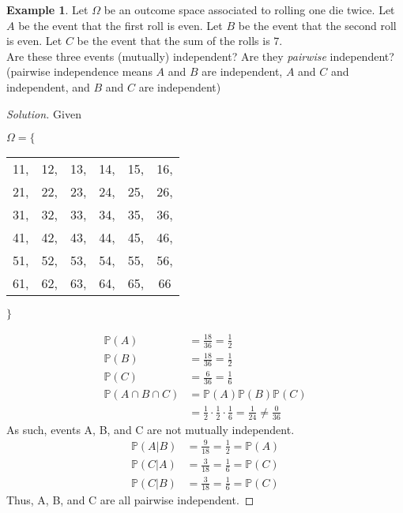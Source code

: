 \documentclass[12pt]{article}
\newcommand{\bbP}{\mathbb{P}}
\renewcommand{\_}[1]{\underline{ #1 }}
\theoremstyle{definition}
\newtheorem{example}[theorem]{Example}
\numberwithin{equation}{subsection}
\begin{document}
	\begin{example}
	Let $\Omega$ be an outcome space associated to rolling one die twice. Let $A$ be the event that the first roll is even. Let $B$ be the event that the second roll is even. Let $C$ be the event that the sum of the rolls is $7$.\\
	Are these three events (mutually) independent? Are they \textit{pairwise} independent? (pairwise independence means $A$ and $B$ are independent, $A$ and $C$ and independent, and $B$ and $C$ are independent)
		\begin{proof}[Solution]
    Given
    \begin{center}
      $\Omega=\Bigg\{$
      \begin{tabular}{ c c c c c c } 
        11, & 12, & 13, & 14, & 15, & 16, \\
        21, & 22, & 23, & 24, & 25, & 26, \\
        31, & 32, & 33, & 34, & 35, & 36, \\
        41, & 42, & 43, & 44, & 45, & 46, \\
        51, & 52, & 53, & 54, & 55, & 56, \\
        61, & 62, & 63, & 64, & 65, & 66
      \end{tabular}
      $\Bigg\}$ \\
    \end{center}
    \begin{align*}
      \bbP(A)&=\frac{18}{36}=\frac{1}{2} \\
      \bbP(B)&=\frac{18}{36}=\frac{1}{2} \\
      \bbP(C)&=\frac{6}{36}=\frac{1}{6} \\
      \bbP(A\cap B\cap C)&=\bbP(A)\bbP(B)\bbP(C) \\
        &=\frac{1}{2}\cdot \frac{1}{2}\cdot \frac{1}{6}=\frac{1}{24} \neq \frac{0}{36}
    \end{align*}
    As such, events A, B, and C are not mutually independent. \\
    \begin{align*}
      \bbP(A|B)&=\frac{9}{18}=\frac{1}{2}=\bbP(A) \\
      \bbP(C|A)&=\frac{3}{18}=\frac{1}{6}=\bbP(C) \\
      \bbP(C|B)&=\frac{3}{18}=\frac{1}{6}=\bbP(C)
    \end{align*}
    Thus, A, B, and C are all pairwise independent.
		\end{proof}
	\end{example}
	
\end{document}
